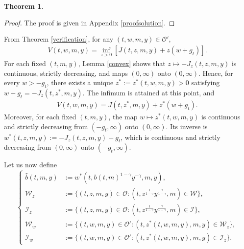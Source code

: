 \documentclass[a4paper,11pt]{amsart}
\numberwithin{equation}{section}
\newtheorem{theorem}{Theorem}[section]
\newcommand{\blue}[1]{{\color{black}#1}}
\begin{document}
{\begin{theorem}
\end{theorem}

\begin{proof}
The proof is given in Appendix \ref{proofsolution}.
\end{proof}



From Theorem \ref{verification}, for any $(t,w,m,y) \in \mathcal{O}'$,
\begin{align*}
V(t,w,m,y)=\inf_{z>0}[J(t,z,m,y)+z(w+g_t)].
\end{align*}
\blue{For each fixed $(t,m,y)$, Lemma \ref{convex} shows that $z\mapsto-J_z(t,z,m,y)$ is continuous, strictly decreasing, and maps $(0,\infty)$ onto $(0,\infty)$. Hence, for every $w>-g_t$, there exists a unique $z^\ast:=z^\ast(t,w,m,y)>0$ satisfying $w+g_t=-J_z(t,z^\ast,m,y)$. The infimum is attained at this point, and
\refstepcounter{equation}
\begin{align*}
V(t,w,m,y)=J(t,z^\ast,m,y)+z^\ast(w+g_t).\tag{\theequation}\label{5-1}
\end{align*}
Moreover, for each fixed $(t,m,y)$, the map $w\mapsto z^\ast(t,w,m,y)$ is continuous and strictly decreasing from $(-g_t,\infty)$ onto $(0,\infty)$. Its inverse is $w^\ast(t,z,m,y):=-J_z(t,z,m,y)-g_t$, which is continuous and strictly decreasing from $(0,\infty)$ onto $(-g_t,\infty)$.}







Let us now define
\begin{equation}\label{newb}
\left\{
\begin{aligned}
\widehat{b}(t,m,y)&:=w^\ast(t,b(t,m)^{1-\gamma}y^{-\gamma},m,y),\\
\mathcal{W}_z &:=\{(t,z,m,y) \in \mathcal{O}: (t, z^{\frac{1}{1-\gamma}}y^{\frac{\gamma}{1-\gamma}}, m) \in \mathcal{W} \},\\
\mathcal{I}_z &:=\{(t,z,m,y) \in  \mathcal{O}:  (t, z^{\frac{1}{1-\gamma}}y^{\frac{\gamma}{1-\gamma}}, m) \in \mathcal{I} \},\\
\mathcal{W}_w&:=\{(t,w,m,y) \in \mathcal{O}': (t,z^\ast(t,w,m,y),m,y) \in \mathcal{W}_z \},\\
\mathcal{I}_w &:=\{(t,w,m,y) \in  \mathcal{O}': (t,z^\ast(t,w,m,y),m,y) \in \mathcal{I}_z \}.
\end{aligned}
\right.
\end{equation}


}
\end{document}

